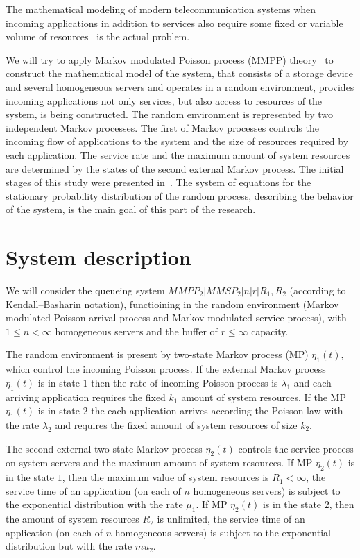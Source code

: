 \documentclass[default]{subfiles}
\begin{document}
{The mathematical modeling of modern telecommunication systems when
incoming applications in addition to services also require some fixed
or variable volume of
resources~\cite{sop1,sop3,sop4,sop5,sop6,sop7,sop8} is the actual
problem.

We will try to apply Markov modulated Poisson process (MMPP)
theory~\cite{Neuts3,Neuts4,Neuts5,Neuts6,4} to construct the
mathematical model of the system, that consists of a storage device
and several homogeneous servers and operates in a random environment,
provides incoming applications not only services, but also access to
resources of the system, is being constructed. The random environment
is represented by two independent Markov processes. The first of
Markov processes controls the incoming flow of applications to the
system and the size of resources required by each application. The
service rate and the maximum amount of system resources are determined
by the states of the second external Markov process.  The initial
stages of this study were presented in~\cite{13}. The system of
equations for the stationary probability distribution of the random
process, describing the behavior of the system, is the main goal of
this part of the research.



\section{System description}
\label{sec:base-section}

We will consider the queueing system $MMPP_2 |MMSP_2 |n|r|R_1,R_2$
(according to Kendall--Basharin notation\cite{Boch}), functioining in
the random environment (Markov modulated Poisson arrival process and
Markov modulated service process), with $1\leqslant  n<\infty$ homogeneous
servers and the buffer of $r\leqslant  \infty$ capacity.


The random environment is present by two-state Markov process (MP)
$\eta_1 (t)$, which control the incoming Poisson process.  If the
external Markov process $\eta_1 (t)$ is in state $1$ then the rate of
incoming Poisson process is $\lambda_1$ and each arriving application
requires the fixed $k_1$ amount of system resources. If the MP
$\eta_1 (t)$ is in state $2$ the each application arrives according
the Poisson law with the rate $\lambda_2$ and requires the fixed
amount of system resources of size $k_2$.

The second external two-state Markov process $\eta_2 (t)$ controls the
service process on system servers and the maximum amount of system
resources. If MP $\eta_2 (t)$ is in the state $1$, then the maximum
value of system resources is $R_1<\infty$, the service time of an
application (on each of $n$ homogeneous servers) is subject to the
exponential distribution with the rate $\mu_1$. If MP $\eta_2 (t)$ is
in the state $2$, then the amount of system resources $R_2$ is
unlimited, the service time of an application (on each of $n$
homogeneous servers) is subject to the exponential distribution but
with the rate $mu_2$.

}
\end{document}
